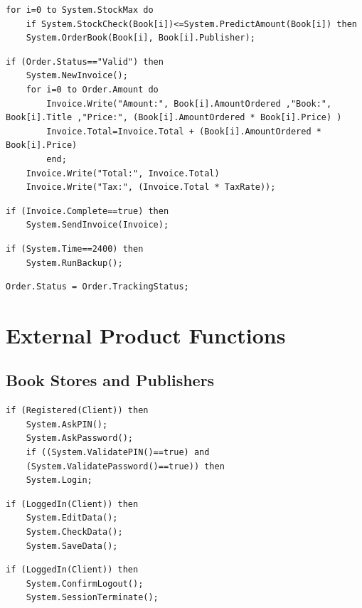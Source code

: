 \documentclass[11pt,a4paper,oneside,svgnames]{report}
\begin{document}
\begin{lstlisting}[caption=/PF16/ BookExpress Order]
 for i=0 to System.StockMax do
 	if System.StockCheck(Book[i])<=System.PredictAmount(Book[i]) then
 	System.OrderBook(Book[i], Book[i].Publisher);
\end{lstlisting}
\begin{lstlisting}[caption=/PF20/ Create Invoice]
if (Order.Status=="Valid") then
	System.NewInvoice();
	for i=0 to Order.Amount do 
		Invoice.Write("Amount:", Book[i].AmountOrdered ,"Book:", Book[i].Title ,"Price:", (Book[i].AmountOrdered * Book[i].Price) )
		Invoice.Total=Invoice.Total + (Book[i].AmountOrdered * Book[i].Price)
		end;
	Invoice.Write("Total:", Invoice.Total)
	Invoice.Write("Tax:", (Invoice.Total * TaxRate));
\end{lstlisting}
\begin{lstlisting}[caption=/PF21/ Send Invoice]
  if (Invoice.Complete==true) then 
  	System.SendInvoice(Invoice);
\end{lstlisting}
\begin{lstlisting}[caption=/PF30/ Backup]
 if (System.Time==2400) then
 	System.RunBackup();
\end{lstlisting}
\begin{lstlisting}[caption=/PF15/ Confirm Delivery]
 Order.Status = Order.TrackingStatus;
\end{lstlisting}

\section{External Product Functions}
\subsection{Book Stores and Publishers}

\begin{lstlisting}[caption=/PF03/ Login]
 if (Registered(Client)) then
 	System.AskPIN();
 	System.AskPassword();
 	if ((System.ValidatePIN()==true) and
 	(System.ValidatePassword()==true)) then
 	System.Login;
\end{lstlisting}

\begin{lstlisting}[caption=/PF04/ Update Account Information]
 if (LoggedIn(Client)) then
 	System.EditData();
 	System.CheckData();
 	System.SaveData();
\end{lstlisting}

\begin{lstlisting}[caption=/PF05/ Logout]
 if (LoggedIn(Client)) then
 	System.ConfirmLogout();
 	System.SessionTerminate();
\end{lstlisting}
\end{document}
